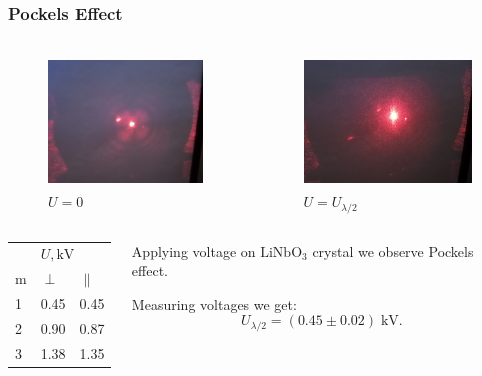 \documentclass{beamer}
\begin{document}
	\begin{frame}
		\frametitle{Pockels Effect}
		
		\begin{columns}
			\begin{column}{0.5\textwidth}
				\begin{figure}
					\centering
					\includegraphics[height=3.5cm]{res/u_0.jpg}
					\vspace{-10pt}
					\caption{\footnotesize  $U = 0$}
				\end{figure}
			
			\end{column}
			\begin{column}{0.5\textwidth}
				\begin{figure}
					\centering
					\includegraphics[height=3.5cm]{res/u_l_2.jpg}
					\vspace{-10pt}
					\caption{\footnotesize  $U = U_{\lambda/2}$}
				\end{figure}
			\end{column}
		\end{columns}
	
		\begin{columns}
			\begin{column}{0.4\textwidth}
				\begin{table}[]
					\begin{tabular}{lll}
						\hline
						& \multicolumn{2}{l}{$U, \text{kV}$} \\
						m & $\perp$    & $\parallel$    \\ \hline
						1 & 0.45         & 0.45             \\
						2 & 0.90         & 0.87             \\
						3 & 1.38         & 1.35             \\ \hline
					\end{tabular}
				\end{table}
			\end{column}
		
			\begin{column}{0.6\textwidth}
				Applying voltage on $\text{LiNbO}_3$ crystal we observe Pockels effect.
				
				Measuring voltages we get:
				$$U_{\lambda/2} = (0.45 \pm 0.02)\; \text{kV}.$$
			\end{column}
		\end{columns}

	\end{frame}
\end{document}
